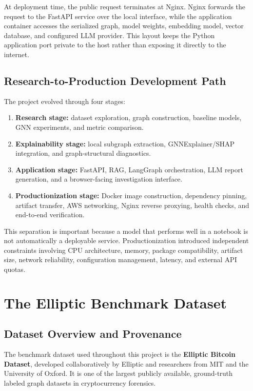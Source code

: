 \documentclass[11pt,a4paper]{report}
\begin{document}
At deployment time, the public request terminates at Nginx. Nginx forwards the request to the FastAPI service over the local interface, while the application container accesses the serialized graph, model weights, embedding model, vector database, and configured LLM provider. This layout keeps the Python application port private to the host rather than exposing it directly to the internet.

\section{Research-to-Production Development Path}

The project evolved through four stages:

\begin{enumerate}[leftmargin=1.5em]
  \item \textbf{Research stage:} dataset exploration, graph construction, baseline models, GNN experiments, and metric comparison.
  \item \textbf{Explainability stage:} local subgraph extraction, GNNExplainer/SHAP integration, and graph-structural diagnostics.
  \item \textbf{Application stage:} FastAPI, RAG, LangGraph orchestration, LLM report generation, and a browser-facing investigation interface.
  \item \textbf{Productionization stage:} Docker image construction, dependency pinning, artifact transfer, AWS networking, Nginx reverse proxying, health checks, and end-to-end verification.
\end{enumerate}

This separation is important because a model that performs well in a notebook is not automatically a deployable service. Productionization introduced independent constraints involving CPU architecture, memory, package compatibility, artifact size, network reliability, configuration management, latency, and external API quotas.

\chapter{The Elliptic Benchmark Dataset}

\section{Dataset Overview and Provenance}
The benchmark dataset used throughout this project is the \textbf{Elliptic Bitcoin Dataset}, developed collaboratively by Elliptic and researchers from MIT and the University of Oxford. It is one of the largest publicly available, ground-truth labeled graph datasets in cryptocurrency forensics.
\end{document}
